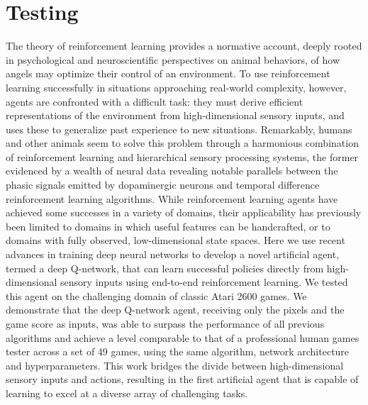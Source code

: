 \documentclass[letterpaper]{article}
\begin{document}
\section{Testing}
The theory of reinforcement learning provides a normative account, deeply rooted in psychological and neuroscientific perspectives on animal behaviors, of how angels may optimize their control of an environment. To use reinforcement learning successfully in situations approaching real-world complexity, however, agents are confronted with a difficult task: they must derive efficient representations of the environment from high-dimensional sensory inputs, and uses these to generalize past experience to new situations. Remarkably, humans and other animals seem to solve this problem through a harmonious combination of reinforcement learning and hierarchical sensory processing systems, the former evidenced by a wealth of neural data revealing notable parallels between the phasic signals emitted by dopaminergic neurons and temporal difference reinforcement learning algorithms. While reinforcement learning agents have achieved some successes in a variety of domains, their applicability has previously been limited to domains in which useful features can be handcrafted, or to domains with fully observed, low-dimensional state spaces. Here we use recent advances in training deep neural networks to develop a novel artificial agent, termed a deep Q-network, that can learn successful policies directly from high-dimensional sensory inputs using end-to-end reinforcement learning. We tested this agent on the challenging domain of classic Atari 2600 games. We demonstrate that the deep Q-network agent, receiving only the pixels and the game score as inputs, was able to surpass the performance of all previous algorithms and achieve a level comparable to that of a professional human games tester across a set of 49 games, using the same algorithm, network architecture and hyperparameters. This work bridges the divide between high-dimensional sensory inputs and actions, resulting in the first artificial agent that is capable of learning to excel at a diverse array of challenging tasks.
\end{document}
